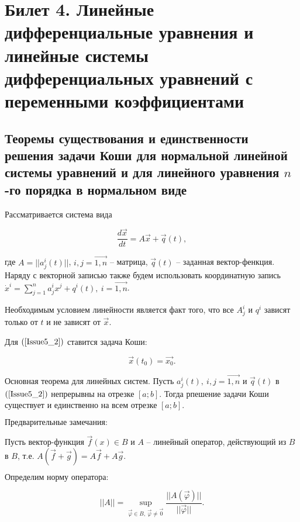 
\section{Билет 4. Линейные дифференциальные уравнения и линейные системы дифференциальных уравнений с переменными коэффициентами}

\subsection{Теоремы существования и единственности решения задачи Коши для нормальной линейной системы уравнений и
для линейного уравнения $n$-го порядка в нормальном виде}

Рассматривается система вида 

\begin{equation}
	\frac{d\overrightarrow{x}}{dt} = A\overrightarrow{x} + \overrightarrow{q}(t),
	\label{Issue5_2}
\end{equation} 

где $A = ||a_j^i(t)||$, $i,j = \overrightarrow{1, n}$ -- матрица, $\overrightarrow{q}(t)$ -- заданная вектор-фенкция. Наряду с векторной записью также будем использовать координатную запись $\dot{x}^i = \sum\limits_{j = 1}^{n} a_j^i x^j + q^i(t),\ i = \overrightarrow{1,n}$.

$\textbf{Необходимым условием линейности}$ является факт того, что все $A_j^i$ и $q^i$ зависят только от $t$ и не зависят от $\overrightarrow{x}$.

Для $(\ref{Issue5_2})$ ставится задача Коши:

\[ \overrightarrow{x}(t_0) = \overrightarrow{x_0}.\]

\begin{theorem}

$\textbf{Основная теорема для линейных систем.}$ Пусть $a_j^i(t),\ i,j = \overrightarrow{1,n}$ и $\overrightarrow{q}(t)$ в $(\ref{Issue5_2})$ непрерывны на отрезке $[a;b]$. Тогда рпешение задачи Коши существует и единственно на всем отрезке $[a;b].$

\end{theorem}

$\textbf{Предварительные замечания:}$

Пусть вектор-функция $\overrightarrow{f}(x) \in B$ и $A$ -- линейный оператор, действующий из $B$ в $B$, т.е. $A(\overrightarrow{f} + \overrightarrow{g}) = A\overrightarrow{f} + A\overrightarrow{g}$.

$\textbf{Определим норму оператора:}$

\[ ||A|| =  \sup\limits_{\overrightarrow{\varphi} \in B,\ \overrightarrow{\varphi} \neq \overrightarrow{0}} \frac{||A(\overrightarrow{\varphi})||}{||\overrightarrow{\varphi}||}. \]

